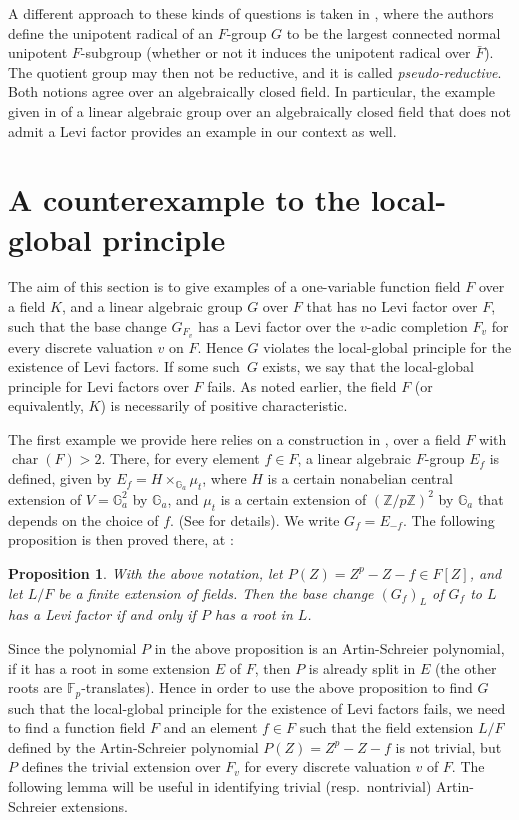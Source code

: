 \documentclass[12pt]{amsart}
\newcommand{\mbb}[1]{\mathbb #1}
\theoremstyle{plain}
\newtheorem{prop}[thm]{Proposition}
\theoremstyle{definition}
\theoremstyle{remark}
\newcommand{\oper}[1]{\operatorname{#1}}
\newcommand{\cha}{\oper{char}}
\begin{document}
A different approach to these kinds of questions is taken in \cite{CGP}, where the authors define the unipotent radical of an $F$-group $G$ to be the largest connected normal unipotent $F$-subgroup (whether or not it induces the unipotent radical over $\bar F$). The quotient group may then not be reductive, and it is called {\em pseudo-reductive}. Both notions agree over an algebraically closed field. In particular, the example given in \cite[Proposition~A.6.4]{CGP} of a linear algebraic group over an algebraically closed field that does not admit a Levi factor provides an example in our context as well.



\section{A counterexample to the local-global principle}
The aim of this section is to give examples of a one-variable function field $F$ over a field $K$, and a linear algebraic group $G$ over $F$ that has no Levi factor over $F$, such that the base change $G_{F_v}$ has a Levi factor over the $v$-adic completion $F_v$ for every discrete valuation $v$ on $F$. Hence $G$ violates the local-global principle for the existence of Levi factors. If some such~$G$ exists, we say that the local-global principle for Levi factors over $F$ fails. As noted earlier, the field $F$ (or equivalently, $K$) is necessarily of positive characteristic.

The first example we provide here relies on a construction in \cite[Section~8]{McNinch}, over a field $F$ with $\cha(F)>2$.  There, for every element $f \in F$, a linear algebraic $F$-group $E_f$ is defined, given by $E_f = H \times_{\mbb G_a} \mu_t$, where $H$ is a certain nonabelian central extension of $V = \mbb G_a^2$ by $\mbb G_a$, and $\mu_t$ is a certain extension of $(\mbb Z/p\mbb Z)^2$ by $\mbb G_a$ that depends on the choice of $f$.  
(See \cite[p.~395]{McNinch} for details).  We write $G_f = E_{-f}$.  The following proposition is then proved there, at \cite[Proposition~8.1]{McNinch}:

\begin{prop}\label{failure-criterion}
With the above notation, let $P(Z)=Z^p-Z-f\in F[Z]$, and let $L/F$ be a finite extension of fields. Then the base change $(G_f)_L$ of $G_f$ to $L$ has a Levi factor if and only if $P$ has a root in $L$.
\end{prop}

Since the polynomial $P$ in the above proposition is an Artin-Schreier polynomial, if it has a root in some extension $E$ of $F$, then $P$ is already split in $E$ (the other roots are ${\mathbb F}_p$-translates). 
Hence in order to use the above proposition to find $G$ such that the local-global principle for the existence of Levi factors fails, we need to find a function field $F$ and an element $f\in F$ such that the field extension $L/F$ defined by the Artin-Schreier polynomial $P(Z)=Z^p-Z-f$ is not trivial, but $P$ defines the trivial extension over $F_v$ for every discrete valuation $v$ of $F$. The following lemma will be useful in identifying trivial (resp.\ nontrivial) Artin-Schreier extensions.
\end{document}
